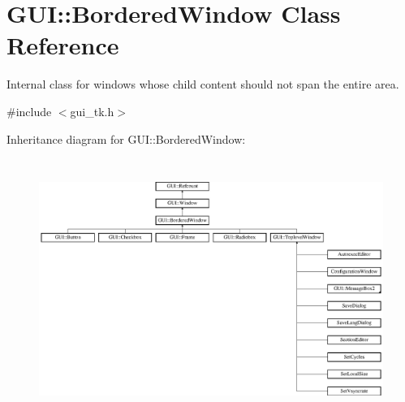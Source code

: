\hypertarget{classGUI_1_1BorderedWindow}{\section{G\-U\-I\-:\-:Bordered\-Window Class Reference}
\label{classGUI_1_1BorderedWindow}
}


Internal class for windows whose child content should not span the entire area.  




{\ttfamily \#include $<$gui\-\_\-tk.\-h$>$}

Inheritance diagram for G\-U\-I\-:\-:Bordered\-Window\-:\begin{figure}[H]
\begin{center}
\leavevmode
\includegraphics[height=8.484848cm]{classGUI_1_1BorderedWindow}
\end{center}
\end{figure}
